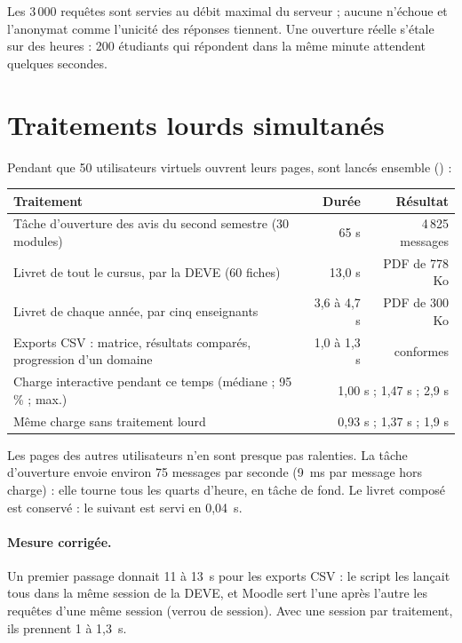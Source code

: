\documentclass[11pt,a4paper]{article}
\newcommand{\code}[1]{\texttt{\detokenize{#1}}}
\begin{document}
Les 3\,000 requêtes sont servies au débit maximal du serveur ; aucune n'échoue et l'anonymat
comme l'unicité des réponses tiennent. Une ouverture réelle s'étale sur des heures : 200
étudiants qui répondent dans la même minute attendent quelques secondes.

\section{Traitements lourds simultanés}

Pendant que 50 utilisateurs virtuels ouvrent leurs pages, sont lancés ensemble
(\code{syllabus_lourds.py}) :

\begin{center}
\begin{tabularx}{\linewidth}{@{}X r r@{}}
\toprule
\textbf{Traitement} & \textbf{Durée} & \textbf{Résultat} \\
\midrule
Tâche d'ouverture des avis du second semestre (30 modules) & 65 s & 4\,825 messages \\
Livret de tout le cursus, par la DEVE (60 fiches) & 13,0 s & PDF de 778 Ko \\
Livret de chaque année, par cinq enseignants & 3,6 à 4,7 s & PDF de 300 Ko \\
Exports CSV : matrice, résultats comparés, progression d'un domaine & 1,0 à 1,3 s & conformes \\
\midrule
Charge interactive pendant ce temps (médiane ; 95\,\% ; max.) & \multicolumn{2}{r}{1,00 s ; 1,47 s ; 2,9 s} \\
Même charge sans traitement lourd & \multicolumn{2}{r}{0,93 s ; 1,37 s ; 1,9 s} \\
\bottomrule
\end{tabularx}
\end{center}

Les pages des autres utilisateurs n'en sont presque pas ralenties. La tâche d'ouverture envoie
environ 75 messages par seconde (9~ms par message hors charge) : elle tourne tous les quarts
d'heure, en tâche de fond. Le livret composé est conservé : le suivant est servi en 0,04~s.

\paragraph{Mesure corrigée.} Un premier passage donnait 11 à 13~s pour les exports CSV : le
script les lançait tous dans la même session de la DEVE, et Moodle sert l'une après l'autre les
requêtes d'une même session (verrou de session). Avec une session par traitement, ils prennent
1 à 1,3~s.
\end{document}

